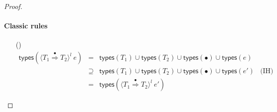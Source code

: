 \documentclass[9pt]{extarticle}
\newcommand{\ottnt}[1]{\mathit{#1}}
\begin{document}
\begin{lemma}
\begin{proof}
{    \paragraph{Classic \lambdah rules}
\begin{itemize}
    \item[(\E{CastInnerC})]  \[ \begin{array}{rclr}
         \mathsf{types} (  \langle  \ottnt{T_{{\mathrm{1}}}}  \mathord{ \overset{ \bullet }{\Rightarrow} }  \ottnt{T_{{\mathrm{2}}}}  \rangle^{ \ottnt{l} } ~  \ottnt{e}  )  &=& 
            \mathsf{types} ( \ottnt{T_{{\mathrm{1}}}} )   \cup   \mathsf{types} ( \ottnt{T_{{\mathrm{2}}}} )    \cup   \mathsf{types} ( \bullet )    \cup   \mathsf{types} ( \ottnt{e} )   & \\
        &\supseteq&     \mathsf{types} ( \ottnt{T_{{\mathrm{1}}}} )   \cup   \mathsf{types} ( \ottnt{T_{{\mathrm{2}}}} )    \cup   \mathsf{types} ( \bullet )    \cup   \mathsf{types} ( \ottnt{e'} )   & \text{(IH)} \\
        &=&  \mathsf{types} (  \langle  \ottnt{T_{{\mathrm{1}}}}  \mathord{ \overset{ \bullet }{\Rightarrow} }  \ottnt{T_{{\mathrm{2}}}}  \rangle^{ \ottnt{l} } ~  \ottnt{e'}  ) 
      \end{array} \]
    \end{itemize} 

}
\end{proof}
\end{lemma}
\end{document}
